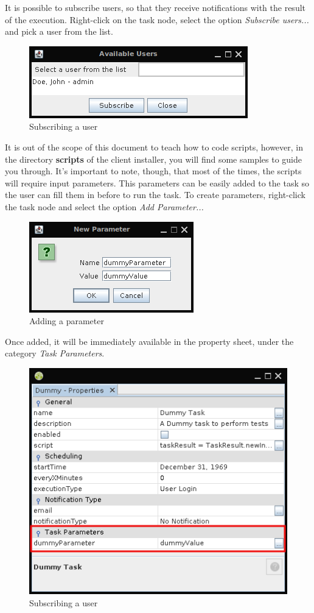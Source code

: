 \documentclass[a4paper]{article}
\begin{document}
		It is possible to subscribe users, so that they receive notifications with the result of the execution. Right-click on the task node, select the option \textit{Subscribe users...} and pick a user from the list.
		\begin{figure}[h!]
			\centering
			\includegraphics[width=0.3\linewidth]{img/task_manager_subscribe_users.png}
			\caption{Subscribing a user}
			\label{fig:task_manager_subscribe_users}
		\end{figure}
		
		It is out of the scope of this document to teach how to code scripts, however, in the directory \textbf{scripts} of the client installer, you will find some samples to guide you through. It's important to note, though, that most of the times, the scripts will require input parameters. This parameters can be easily added to the task so the user can fill them in before to run the task. To create parameters, right-click the task node and select the option \textit{Add Parameter...}
		\begin{figure}[h!]
			\centering
			\includegraphics[width=0.3\linewidth]{img/task_manager_add_parameter.png}
			\caption{Adding a parameter}
			\label{fig:task_manager_add_parameter}
		\end{figure}
		
		Once added, it will be immediately available in the property sheet, under the category \textit{Task Parameters}.
		\begin{figure}[h!]
			\centering
			\includegraphics[width=0.5\linewidth]{img/task_manager_property_sheet.png}
			\caption{Subscribing a user}
			\label{fig:task_manager_property_sheet}
		\end{figure}
		
\end{document}
